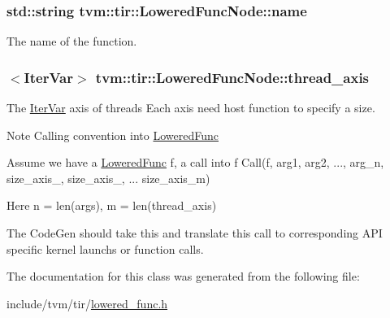 \subsubsection[{\texorpdfstring{name}{name}}]{\setlength{\rightskip}{0pt plus 5cm}std\+::string tvm\+::tir\+::\+Lowered\+Func\+Node\+::name}\hypertarget{classtvm_1_1tir_1_1LoweredFuncNode_afdd73b0418a0e703e755046836aef3d6}{}\label{classtvm_1_1tir_1_1LoweredFuncNode_afdd73b0418a0e703e755046836aef3d6}


The name of the function. 

\subsubsection[{\texorpdfstring{thread\+\_\+axis}{thread_axis}}]{$<${\bf Iter\+Var}$>$ tvm\+::tir\+::\+Lowered\+Func\+Node\+::thread\+\_\+axis}\hypertarget{classtvm_1_1tir_1_1LoweredFuncNode_a844230451f80a6bea09bb81527d032df}{}\label{classtvm_1_1tir_1_1LoweredFuncNode_a844230451f80a6bea09bb81527d032df}


The \hyperlink{classtvm_1_1tir_1_1IterVar}{Iter\+Var} axis of threads Each axis need host function to specify a size. 

\begin{DoxyNote}{Note}
Calling convention into \hyperlink{classtvm_1_1tir_1_1LoweredFunc}{Lowered\+Func}
\end{DoxyNote}
Assume we have a \hyperlink{classtvm_1_1tir_1_1LoweredFunc}{Lowered\+Func} f, a call into f Call(f, arg1, arg2, ..., arg\+\_\+n, size\+\_\+axis\+\_, size\+\_\+axis\+\_, ... size\+\_\+axis\+\_\+m)

Here n = len(args), m = len(thread\+\_\+axis)

The Code\+Gen should take this and translate this call to corresponding A\+PI specific kernel launchs or function calls. 

The documentation for this class was generated from the following file\+:\begin{DoxyCompactItemize}
\item 
include/tvm/tir/\hyperlink{lowered__func_8h}{lowered\+\_\+func.\+h}\end{DoxyCompactItemize}
